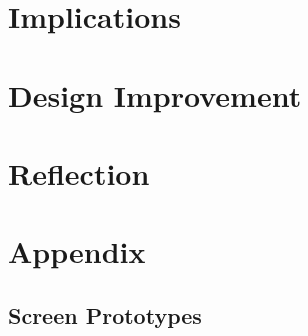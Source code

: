 \documentclass[pdftex,12pt,a4paper]{report}
\begin{document}
\chapter{Implications}
\chapter{Design Improvement}
\chapter{Reflection}
\chapter{Appendix}
\section*{Screen Prototypes}
\end{document}
